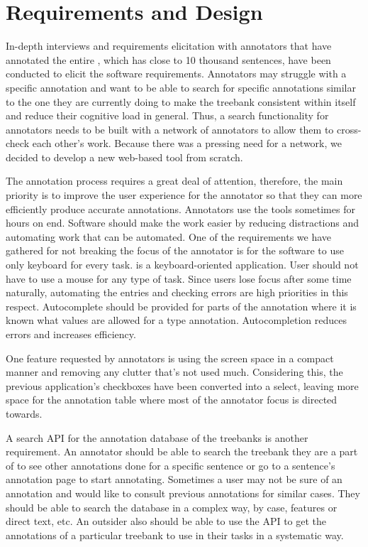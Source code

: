\section{Requirements and Design}
\label{sec:requirements}

In-depth interviews and requirements elicitation with annotators that have annotated the entire \bountreebank{}, which has close to 10 thousand sentences, have been conducted to elicit the software requirements.
Annotators may struggle with a specific annotation and want to be able to search for specific annotations similar to the one they are currently doing to make the treebank consistent within itself and reduce their cognitive load in general.
Thus, a search functionality for annotators needs to be built with a network of annotators to allow them to cross-check each other's work.
Because there was a pressing need for a network, we decided to develop a new web-based tool from scratch.

The annotation process requires a great deal of attention, therefore, the main priority is to improve the user experience for the annotator so that they can more efficiently produce accurate annotations.
Annotators use the tools sometimes for hours on end.
Software should make the work easier by reducing distractions and automating work that can be automated.
One of the requirements we have gathered for not breaking the focus of the annotator is for the software to use only keyboard for every task.
\boat{} is a keyboard-oriented application.
User should not have to use a mouse for any type of task.
Since users lose focus after some time naturally, automating the entries and checking errors are high priorities in this respect.
Autocomplete should be provided for parts of the annotation where it is known what values are allowed for a \conllu{} type annotation.
Autocompletion reduces errors and increases efficiency.

One feature requested by annotators is using the screen space in a compact manner and removing any clutter that's not used much.
Considering this, the previous application's checkboxes have been converted into a select, leaving more space for the annotation table where most of the annotator focus is directed towards.

A search API for the annotation database of the treebanks is another requirement.
An annotator should be able to search the treebank they are a part of to see other annotations done for a specific sentence or go to a sentence's annotation page to start annotating.
Sometimes a user may not be sure of an annotation and would like to consult previous annotations for similar cases.
They should be able to search the database in a complex way, by case, features or direct text, etc.
An outsider also should be able to use the API to get the annotations of a particular treebank to use in their tasks in a systematic way.
